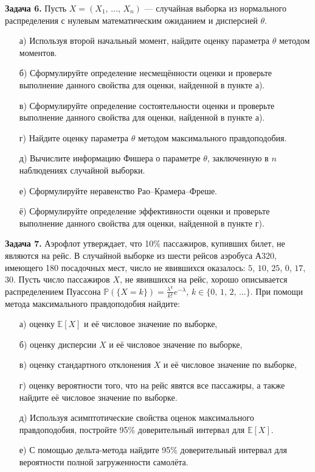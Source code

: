 \documentclass[a4paper, 12pt]{article}
\begin{document}
\textbf{Задача 6.}
Пусть $X = (X_1, \, \ldots, \, X_n)$ --- случайная выборка из нормального распределения с нулевым математическим ожиданием и дисперсией $\theta$.
\begin{itemize}
  \item[а)] Используя второй начальный момент, найдите оценку параметра $\theta$ методом моментов.
  \item[б)] Сформулируйте определение несмещённости оценки и проверьте выполнение данного свойства для оценки, найденной в пункте а).
  \item[в)] Сформулируйте определение состоятельности оценки и проверьте выполнение данного свойства для оценки, найденной в пункте а).
  \item[г)] Найдите оценку параметра $\theta$ методом максимального правдоподобия.
  \item[д)] Вычислите информацию Фишера о параметре $\theta$, заключенную в $n$ наблюдениях случайной выборки.
  \item[е)] Сформулируйте неравенство Рао--Крамера--Фреше.
  \item[ё)] Сформулируйте определение эффективности оценки и проверьте выполнение данного свойства для оценки, найденной в пункте г).
\end{itemize}


\medskip

\textbf{Задача 7.}
Аэрофлот утверждает, что 10\% пассажиров, купивших билет, не являются на рейс. В случайной выборке из шести рейсов аэробуса А320, имеющего 180 посадочных мест, число не явившихся оказалось: $5$, $10$, $25$, $0$, $17$, $30$. Пусть число пассажиров $X$, не явившихся на рейс, хорошо описывается распределением Пуассона $\mathbb{P}(\{X = k\}) = \tfrac{\lambda^{k}}{k!}e^{-\lambda}$, $k \in \{0,\, 1,\, 2,\, \ldots\}$. При помощи метода максимального правдоподобия найдите:
\begin{itemize}
  \item[а)] оценку $\mathbb{E}[X]$ и её числовое значение по выборке,
  \item[б)] оценку дисперсии $X$ и её числовое значение по выборке,
  \item[в)] оценку стандартного отклонения $X$ и её числовое значение по выборке,
  \item[г)] оценку вероятности того, что на рейс явятся все пассажиры, а также найдите её числовое значение по выборке.
  \item[д)] Используя асимптотические свойства оценок максимального правдоподобия, постройте 95\% доверительный интервал для $\mathbb{E}[X]$.
  \item[е)] С помощью дельта-метода найдите 95\% доверительный интервал для вероятности полной загруженности самолёта.
\end{itemize}
\end{document}
